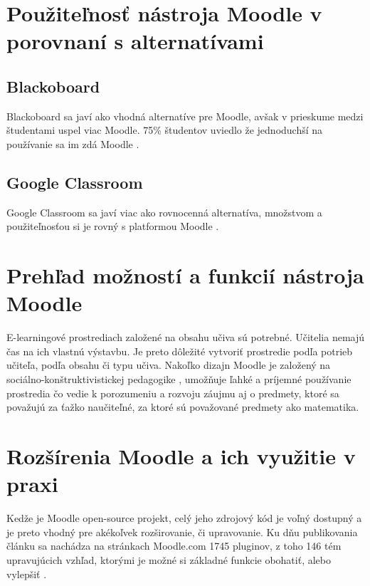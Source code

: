 \documentclass[10pt,twoside,slovak,a4paper]{article}
\begin{document}
\section{Použiteľnosť nástroja Moodle v porovnaní s alternatívami } \label{pouzitelnost}

\subsection{Blackoboard} \label{pouzitelnost:blackboard}

Blackoboard sa javí ako vhodná alternatíve pre Moodle, avšak v prieskume medzi študentami uspel viac Moodle. 75\% študentov uviedlo že jednoduchší na používanie sa im zdá Moodle \cite{machado2007blackboard}.

\subsection{Google Classroom} \label{pouzitelnost:classroom}

Google Classroom sa javí viac ako rovnocenná alternatíva, množstvom a použiteľnosťou si je rovný s platformou Moodle \cite{barmanfacilitating} . 


\section{Prehľad možností a funkcií nástroja Moodle} \label{funkcie}

E-learningové prostrediach založené na obsahu učiva sú potrebné. Učitelia nemajú čas na ich vlastnú výstavbu. Je preto dôležité vytvoriť prostredie podľa potrieb učiteľa, podľa obsahu či typu učiva. Nakoľko dizajn Moodle je založený na sociálno-konštruktivistickej pedagogike \cite{klaus2005you}, umožňuje ľahké a príjemné používanie prostredia čo vedie k porozumeniu a rozvoju záujmu aj o predmety, ktoré sa považujú za ťažko naučiteľné, za ktoré sú považované predmety ako matematika.


\section{Rozšírenia Moodle a ich využitie v praxi} \label{rozsirenia}
Kedže je Moodle open-source projekt, celý jeho zdrojový kód je voľný dostupný a je preto vhodný pre akékoľvek rozširovanie, či upravovanie. Ku dňu publikovania článku sa nachádza na stránkach Moodle.com 1745 pluginov, z toho 146 tém upravujúcich vzhľad, ktorými je možné si základné funkcie obohatiť, alebo vylepšiť \cite{Moodle:plugins}.
\end{document}
